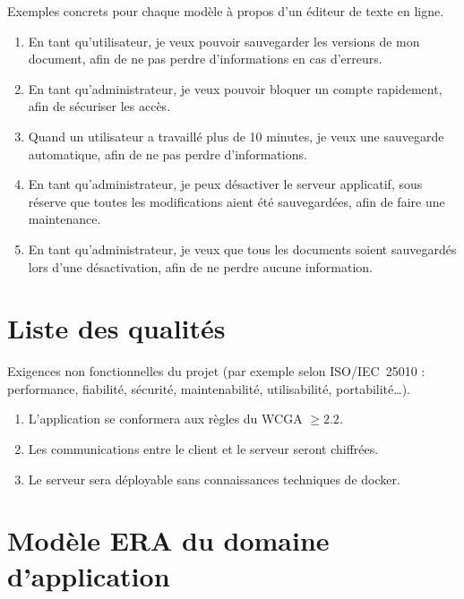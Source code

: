 \documentclass[a4paper,11pt]{article}
\begin{document}
Exemples concrets pour chaque modèle à propos d'un éditeur de texte en ligne.

\begin{enumerate}

\item[F001] En tant qu'utilisateur, je veux pouvoir sauvegarder les
  versions de mon document, afin de ne pas perdre d'informations en
  cas d'erreurs.

\item[F002] En tant qu'administrateur, je veux pouvoir bloquer un
  compte rapidement, afin de sécuriser les accès.

\item[F003] Quand un utilisateur a travaillé plus de 10 minutes, je veux une
  sauvegarde automatique, afin de ne pas perdre d'informations.

\item[F004] En tant qu'administrateur, je peux désactiver le serveur
  applicatif, sous réserve que toutes les modifications aient été
  sauvegardées, afin de faire une maintenance.

\item[F005] En tant qu'administrateur, je veux que tous les documents
  soient sauvegardés lors d'une désactivation, afin de ne perdre
  aucune information.

\end{enumerate}


\section{Liste des qualités}
\label{sec:qualites}

Exigences non fonctionnelles du projet (par exemple selon ISO/IEC~25010 :
performance, fiabilité, sécurité, maintenabilité, utilisabilité, portabilité\ldots).

\begin{enumerate}
\item[Q001] L'application se conformera aux règles du WCGA $\geq 2.2$.
\item[Q002] Les communications entre le client et le serveur seront chiffrées.
\item[Q003] Le serveur sera déployable sans connaissances techniques de docker.
\end{enumerate}

\clearpage\newpage
\section{Modèle ERA du domaine d'application}
\label{sec:era}
\end{document}
